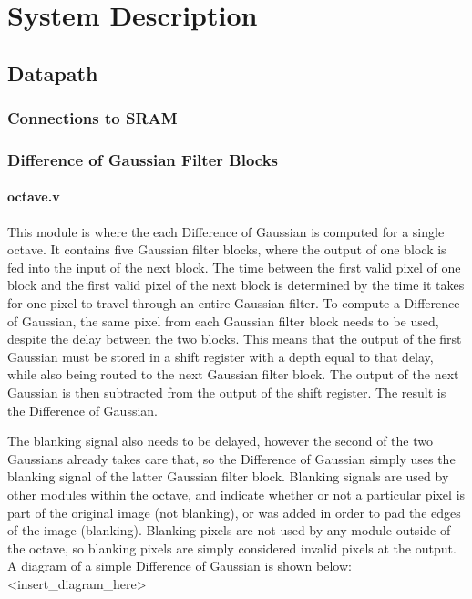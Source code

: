 \documentclass[12pt]{article}
\begin{document}
\section{System Description}

\subsection{Datapath}

\subsubsection{Connections to SRAM}


\subsubsection{Difference of Gaussian Filter Blocks}

\paragraph{octave.v}

This module is where the each Difference of Gaussian is computed for a single 
octave. It contains five Gaussian filter blocks, where the output of one block 
is fed into the input of the next block. The time between the first valid pixel 
of one block and the first valid pixel of the next block is determined by the 
time it takes for one pixel to travel through an entire Gaussian filter. To 
compute a Difference of Gaussian, the same pixel from each Gaussian filter block 
needs to be used, despite the delay between the two blocks. This means that the 
output of the first Gaussian must be stored in a shift register with a depth 
equal to that delay, while also being routed to the next Gaussian filter block. 
The output of the next Gaussian is then subtracted from the output of the shift 
register. The result is the Difference of Gaussian.

The blanking signal also needs to be delayed, however the second of the two 
Gaussians already takes care that, so the Difference of Gaussian simply uses the 
blanking signal of the latter Gaussian filter block. Blanking signals are used 
by other modules within the octave, and indicate whether or not a particular 
pixel is part of the original image (not blanking), or was added in order to pad 
the edges of the image (blanking). Blanking pixels are not used by any module 
outside of the octave, so blanking pixels are simply considered invalid pixels 
at the output. A diagram of a simple Difference of Gaussian is shown below: 
<insert\_diagram\_here>
\end{document}
